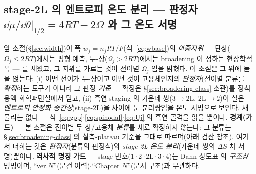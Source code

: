 \subsection{stage-2L 의 엔트로피 온도 분리 --- 판정자 $\dd\mu/\dd\theta|_{1/2}=4RT-2\Omega$ 와 그 온도 서명}\label{ssec:gr-2L}
앞 소절(\S\ref{sec:width})이 폭 $w_j=n_jRT/F$(식~\eqref{eq:wbase})의 \emph{이중지위} --- 단상($\Omega_j\le2RT$)에서는
평형 예측, 두-상($\Omega_j>2RT$)에서는 broadening 이 정하는 현상학적 폭 --- 를 세웠고, 그 지위를 가르는 것이
전이별 $\Omega_j$ 임을 밝혔다. 이 소절은 그 위에 둘을 얹는다: (i) 어떤 전이가 두-상이고 어떤 것이 고용체인지의
\emph{판정자}(전이별 분류를 \emph{확정}하는 도구가 아니라 그 판정 \emph{기준} --- 확정은 \S\ref{sec:broadening-class}
소관)를 정칙용액 화학퍼텐셜에서 닫고, (ii) 흑연 staging 의 가운데 쌍($3\!\to\!2\mathrm L,\,2\mathrm L\!\to\!2$)이
실은 \emph{엔트로피 안정화 중간상}(stage-2L)을 사이에 둔 분리쌍임을 온도 서명으로 보인다. 새 물리는 없다 ---
식~\eqref{eq:gpp}$\cdot$\eqref{eq:spinodal}$\cdot$\eqref{eq:Uj} 의 흑연 골격을 읽을 뿐이다.
\textbf{경계(가드)} --- 본 소절은 전이별 두-상/고용체 \emph{분류}를 새로 확정하지 않는다: 그 분류는
\S\ref{sec:broadening-class} 의 실측-plateau 기준을 그대로 따르며(아래 검산 참조), 여기서 더하는 것은
\emph{판정자}(분류의 판정식)와 \emph{stage-2L 온도 분리}(가운데 쌍의 $\Delta S$ 차 서명)뿐이다.
\textbf{역사적 명칭 가드} --- stage 번호($1\cdot2\cdot2\mathrm L\cdot3\cdot4$)는 Dahn 상도표\cite{dahn1991} 의
\emph{구조상} 명명이며, ``ver.$N$''(문건 이력)$\cdot$``Chapter $N$''(문서 구조)과 무관하다.

